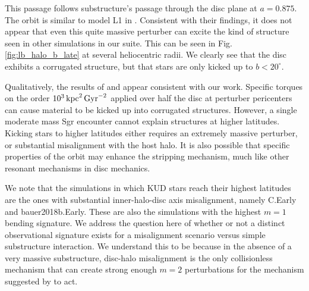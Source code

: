 This passage follows substructure's passage through the disc plane at $a=0.875$. The orbit is similar to model L1 in \citet{laporte_2018_b}. Consistent with their findings, it does not appear that even this quite massive perturber can excite the kind of structure seen in other simulations in our suite. This can be seen in Fig. \ref{fig:lb_halo_b_late} at several heliocentric radii. We clearly see that the disc exhibits a corrugated structure, but that stars are only kicked up to $b<20^\circ$. 

Qualitatively, the results of \citet{laporte_2018_b} and \citet{laporte_2019_feathers} appear consistent with our work. Specific torques on the order $10^3 \, \text{kpc}^2\,\text{Gyr}^{-2}$ applied over half the disc at perturber pericenters can cause material to be kicked up into corrugated structures. However, a single moderate mass Sgr encounter cannot explain structures at higher latitudes. Kicking stars to higher latitudes either requires an extremely massive perturber, or substantial misalignment with the host halo. It is also possible that specific properties of the orbit may enhance the stripping mechanism, much like other resonant mechanisms in disc mechanics.

We note that the simulations in which KUD stars reach their highest latitudes are the ones with substantial inner-halo-disc axis misalignment, namely C.Early and bauer2018b.Early. These are also the simulations with the highest $m=1$ bending signature. We address the question here of whether or not a distinct observational signature exists for a misalignment scenario versus simple substructure interaction. We understand this to be because in the absence of a very massive substructure, disc-halo misalignment is the only collisionless mechanism that can create strong enough $m=2$ perturbations for the mechanism suggested by \citet{laporte_2019_feathers} to act.


